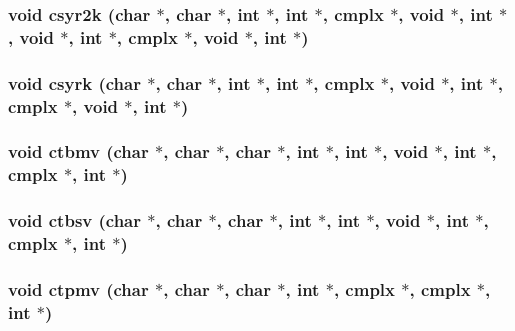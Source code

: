 \subsubsection{\setlength{\rightskip}{0pt plus 5cm}void csyr2k (char $\ast$, char $\ast$, int $\ast$, int $\ast$, {\bf cmplx} $\ast$, void $\ast$, int $\ast$, void $\ast$, int $\ast$, {\bf cmplx} $\ast$, void $\ast$, int $\ast$)}\label{essl_8h_01d3d201ae5509dac69e428c07b48107}


\subsubsection{\setlength{\rightskip}{0pt plus 5cm}void csyrk (char $\ast$, char $\ast$, int $\ast$, int $\ast$, {\bf cmplx} $\ast$, void $\ast$, int $\ast$, {\bf cmplx} $\ast$, void $\ast$, int $\ast$)}\label{essl_8h_2018bc49a4e1ea2a3cc7c0b9c5d012b8}


\subsubsection{\setlength{\rightskip}{0pt plus 5cm}void ctbmv (char $\ast$, char $\ast$, char $\ast$, int $\ast$, int $\ast$, void $\ast$, int $\ast$, {\bf cmplx} $\ast$, int $\ast$)}\label{essl_8h_aef248ead40bf24c5a78b806f5bf64d6}


\subsubsection{\setlength{\rightskip}{0pt plus 5cm}void ctbsv (char $\ast$, char $\ast$, char $\ast$, int $\ast$, int $\ast$, void $\ast$, int $\ast$, {\bf cmplx} $\ast$, int $\ast$)}\label{essl_8h_55cba58ad9675542457a93ca7642095e}


\subsubsection{\setlength{\rightskip}{0pt plus 5cm}void ctpmv (char $\ast$, char $\ast$, char $\ast$, int $\ast$, {\bf cmplx} $\ast$, {\bf cmplx} $\ast$, int $\ast$)}\label{essl_8h_cfc6949a8138693d1b7e739149ed127f}


